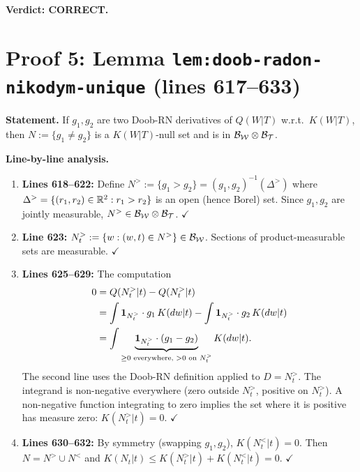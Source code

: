 \documentclass{article}
\begin{document}
\textbf{Verdict: CORRECT.}

\section{Proof 5: Lemma \texttt{lem:doob-radon-nikodym-unique} (lines 617--633)}

\textbf{Statement.} If $g_1,g_2$ are two Doob-RN derivatives of $Q(W|T)$
w.r.t.\ $K(W|T)$, then $N:=\{g_1 \neq g_2\}$ is a $K(W|T)$-null set and is
in $\mathcal{B}_{\mathcal{W}}\otimes\mathcal{B}_{\mathcal{T}}$.

\textbf{Line-by-line analysis.}

\begin{enumerate}[leftmargin=*]
  \item \textbf{Lines 618--622:} Define
    $N^> := \{g_1 > g_2\} = (g_1,g_2)^{-1}(\Delta^>)$ where
    $\Delta^>=\{(r_1,r_2)\in\mathbb{R}^2:r_1>r_2\}$ is an open (hence Borel) set.
    Since $g_1,g_2$ are jointly measurable,
    $N^> \in \mathcal{B}_{\mathcal{W}}\otimes\mathcal{B}_{\mathcal{T}}$.  $\checkmark$

  \item \textbf{Line 623:} $N^>_t := \{w:(w,t)\in N^>\}\in\mathcal{B}_{\mathcal{W}}$.
    Sections of product-measurable sets are measurable.  $\checkmark$

  \item \textbf{Lines 625--629:} The computation
    \begin{align*}
      0 &= Q(N^>_t|t) - Q(N^>_t|t) \\
        &= \int \mathbf{1}_{N^>_t}\cdot g_1\,K(dw|t)
         - \int \mathbf{1}_{N^>_t}\cdot g_2\,K(dw|t) \\
        &= \int \underbrace{\mathbf{1}_{N^>_t}\cdot(g_1-g_2)}_{%
          \ge 0 \text{ everywhere, } > 0 \text{ on } N^>_t} K(dw|t).
    \end{align*}
    The second line uses the Doob-RN definition applied to $D=N^>_t$.
    The integrand is non-negative everywhere (zero outside $N^>_t$, positive
    on $N^>_t$).  A non-negative function integrating to zero implies the set
    where it is positive has measure zero: $K(N^>_t|t)=0$.  $\checkmark$

  \item \textbf{Lines 630--632:} By symmetry (swapping $g_1,g_2$),
    $K(N^<_t|t)=0$.  Then $N = N^>\cup N^<$ and
    $K(N_t|t) \le K(N^>_t|t)+K(N^<_t|t) = 0$.  $\checkmark$
\end{enumerate}
\end{document}

